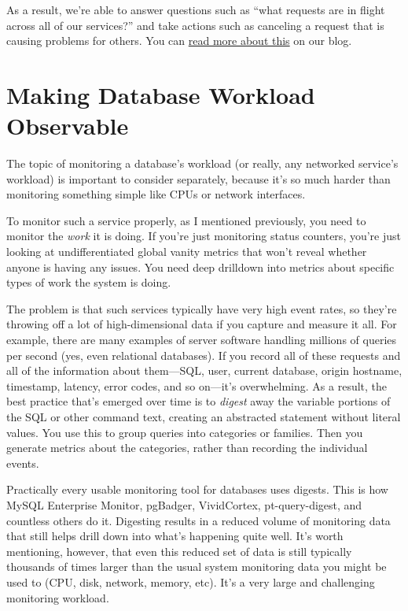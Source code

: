 \documentclass{vivid_layout}
\begin{document}
As a result, we're able to answer questions such as ``what requests are in
flight across all of our services?'' and take actions such as canceling a
request that is causing problems for others. You can
\href{https://www.vividcortex.com/blog/2014/11/06/inside-distributed-architecture/}{read more about this}
on our blog.

\section{Making Database Workload Observable}

The topic of monitoring a database's workload (or really, any networked
service's workload) is important to consider separately, because it's so much
harder than monitoring something simple like CPUs or network interfaces.

To monitor such a service properly, as I mentioned previously, you need to
monitor the \emph{work} it is doing. If you're just monitoring status counters,
you're just looking at undifferentiated global vanity metrics that won't
reveal whether anyone is having any issues. You need deep drilldown into metrics
about specific types of work the system is doing.

The problem is that such services typically have very high event rates, so
they're throwing off a lot of high-dimensional data if you capture and measure
it all. For example, there are many examples of server software handling
millions of queries per second (yes, even relational databases). If you record
all of these requests and all of the information about them---SQL, user, current
database, origin hostname, timestamp, latency, error codes, and so on---it's 
overwhelming. As a result, the best practice that's emerged over time is to
\emph{digest} away the variable portions of the SQL or other command text,
creating an abstracted statement without literal values. You use this to
group queries into categories or families. Then you generate metrics about the
categories, rather than recording the individual events.

Practically every usable monitoring tool for databases uses digests. This is how
MySQL Enterprise Monitor, pgBadger, VividCortex, pt-query-digest, and countless
others do it. Digesting results in a reduced volume of monitoring data that still
helps drill down into what's happening quite well. It's worth mentioning,
however, that even this reduced set of data is still typically thousands of
times larger than the usual system monitoring data you might be used to (CPU,
disk, network, memory, etc). It's a very large and challenging monitoring
workload.
\end{document}
